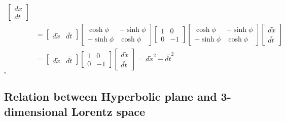 \documentclass[10pt,a4paper]{article}
\renewenvironment{proof}{{\sffamily\bfseries Proof:~}}{\hfill$\square$}
\begin{document}
\begin{proof}
\begin{align*}
\begin{bmatrix}
        dx \\ dt
    \end{bmatrix}\\
    &= \begin{bmatrix}
        d\tilde{x} & d\tilde{t}
    \end{bmatrix}
    \begin{bmatrix}
        \cosh{\phi} & -\sinh{\phi}\\
        -\sinh{\phi} & \cosh{\phi}
    \end{bmatrix}
    \begin{bmatrix}
        1 & 0\\0 & -1
    \end{bmatrix}
    \begin{bmatrix}
        \cosh{\phi} & -\sinh{\phi}\\
        -\sinh{\phi} & \cosh{\phi}
    \end{bmatrix}
    \begin{bmatrix}
        d\tilde{x} \\ d\tilde{t}
    \end{bmatrix}\\
    &=\begin{bmatrix}
        d\tilde{x} & d\tilde{t}
    \end{bmatrix}
    \begin{bmatrix}
        1 & 0\\
        0 & -1
    \end{bmatrix}
    \begin{bmatrix}
        d\tilde{x} \\ d\tilde{t}
    \end{bmatrix} = d\tilde{x}^2 - d\tilde{t}^2
\end{align*}
\end{proof}
\subsection{Relation between Hyperbolic plane and 3-dimensional Lorentz space}
\end{document}
